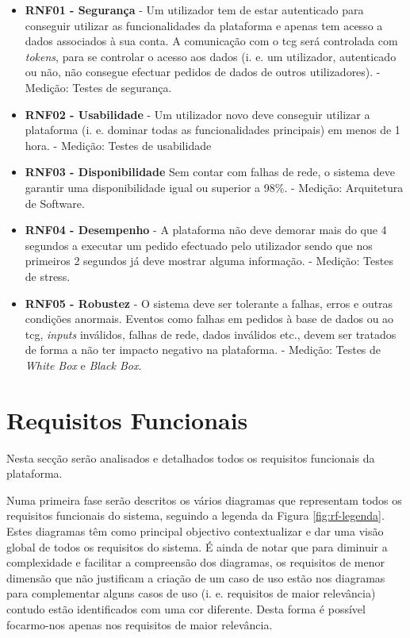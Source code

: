 \begin{itemize}
	\item \textbf{RNF01 - Segurança}
	\subitem - Um utilizador tem de estar autenticado para conseguir utilizar as funcionalidades da plataforma e apenas tem acesso a dados associados à sua conta. A comunicação com o \acrshort{tcg} será controlada com \textit{tokens}, para se controlar o acesso aos dados (i. e. um utilizador, autenticado ou não, não consegue efectuar pedidos de dados de outros utilizadores).
	\subitem - Medição: Testes de segurança.
	
	\item \textbf{RNF02 - Usabilidade} 
	\subitem - Um utilizador novo deve conseguir utilizar a plataforma (i. e. dominar todas as funcionalidades principais) em menos de 1 hora.
	\subitem - Medição: Testes de usabilidade
	
	\item \textbf{RNF03 - Disponibilidade}
	\subitem Sem contar com falhas de rede, o sistema deve garantir uma disponibilidade  igual ou superior a 98\%.
	\subitem - Medição: Arquitetura de Software.
	
	\item \textbf{RNF04 - Desempenho}
	\subitem - A plataforma não deve demorar mais do que 4 segundos a executar um pedido efectuado pelo utilizador sendo que nos primeiros 2 segundos já deve mostrar alguma informação.
	\subitem - Medição: Testes de stress.
	
	\item \textbf{RNF05 - Robustez}
	\subitem - O sistema deve ser tolerante a falhas, erros e outras condições anormais. Eventos como falhas em pedidos à base de dados ou ao \acrshort{tcg}, \textit{inputs} inválidos, falhas de rede, dados inválidos etc., devem ser tratados de forma a não ter impacto negativo na plataforma.
	\subitem - Medição: Testes de \textit{White Box} e \textit{Black Box}.
\end{itemize}


\section{Requisitos Funcionais}
\label{rf}

Nesta secção serão analisados e detalhados todos os requisitos funcionais da plataforma.

Numa primeira fase serão descritos os vários diagramas que representam todos os requisitos funcionais do sistema, seguindo a legenda da Figura \ref{fig:rf-legenda}. Estes diagramas têm como principal objectivo contextualizar e dar uma visão global de todos os requisitos do sistema. É ainda de notar que para diminuir a complexidade e facilitar a compreensão dos diagramas, os requisitos de menor dimensão que não justificam a criação de um caso de uso estão nos diagramas para complementar alguns casos de uso (i. e. requisitos de maior relevância) contudo estão identificados com uma cor diferente. Desta forma é possível focarmo-nos apenas nos requisitos de maior relevância.

